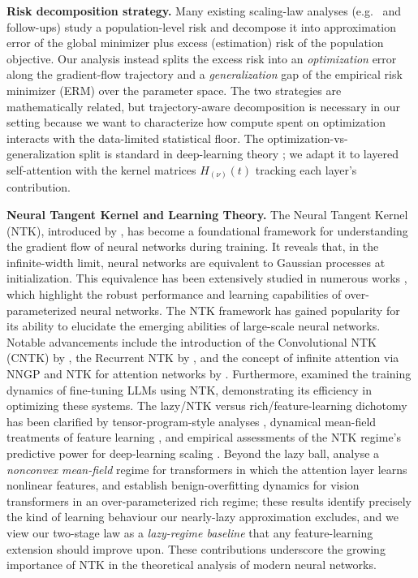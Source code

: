 \documentclass[11pt]{article}
\let\citet\citep
\theoremstyle{plain}
\begin{document}
{\bf Risk decomposition strategy.}
Many existing scaling-law analyses (e.g.~\citep{lwk+24} and follow-ups) study a population-level risk and decompose it into approximation error of the global minimizer plus excess (estimation) risk of the population objective. Our analysis instead splits the excess risk into an {\it optimization} error along the gradient-flow trajectory and a {\it generalization} gap of the empirical risk minimizer (ERM) over the parameter space. The two strategies are mathematically related, but trajectory-aware decomposition is necessary in our setting because we want to characterize how compute spent on optimization interacts with the data-limited statistical floor. The optimization-vs-generalization split is standard in deep-learning theory \citep{dzps19, adh+19}; we adapt it to layered self-attention with the kernel matrices $H_{(\nu)}(t)$ tracking each layer's contribution.

{\bf Neural Tangent Kernel and Learning Theory.}
The Neural Tangent Kernel (NTK), introduced by \citet{jgh18}, has become a foundational framework for understanding the gradient flow of neural networks during training. It reveals that, in the infinite-width limit, neural networks are equivalent to Gaussian processes at initialization. This equivalence has been extensively studied in numerous works \citep{ll18, dzps19, sy19, azls19, wllm19, bm19, lsp+20, cb20, swl21, zgj21, sk22, gms23, gll+24, swl24}, which highlight the robust performance and learning capabilities of over-parameterized neural networks. The NTK framework has gained popularity for its ability to elucidate the emerging abilities of large-scale neural networks. Notable advancements include the introduction of the Convolutional NTK (CNTK) by \citet{adh+19}, the Recurrent NTK by \citet{awbb20}, and the concept of infinite attention via NNGP and NTK for attention networks by \citet{hbsdn20}. Furthermore, \citet{mwy+23} examined the training dynamics of fine-tuning LLMs using NTK, demonstrating its efficiency in optimizing these systems. The lazy/NTK versus rich/feature-learning dichotomy has been clarified by tensor-program-style analyses \citep{ynh+22, kar24}, dynamical mean-field treatments of feature learning \citep{boc+25, bcp24}, and empirical assessments of the NTK regime's predictive power for deep-learning scaling \citep{vbn22}. Beyond the lazy ball, \citet{ks24_nonlinear} analyse a {\it nonconvex mean-field} regime for transformers in which the attention layer learns nonlinear features, and \citet{jhz+24_benign} establish benign-overfitting dynamics for vision transformers in an over-parameterized rich regime; these results identify precisely the kind of learning behaviour our nearly-lazy approximation excludes, and we view our two-stage law as a {\it lazy-regime baseline} that any feature-learning extension should improve upon. These contributions underscore the growing importance of NTK in the theoretical analysis of modern neural networks.
\end{document}
